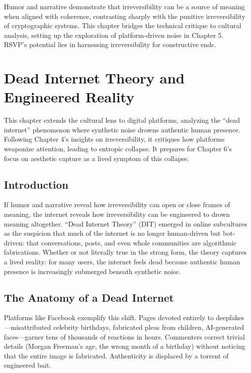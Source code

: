 \documentclass[openany]{book}
\begin{document}
Humor and narrative demonstrate that irreversibility can be a source of meaning when aligned with coherence, contrasting sharply with the punitive irreversibility of cryptographic systems. This chapter bridges the technical critique to cultural analysis, setting up the exploration of platform-driven noise in Chapter 5. RSVP’s potential lies in harnessing irreversibility for constructive ends.

\chapter{Dead Internet Theory and\\ Engineered Reality}

This chapter extends the cultural lens to digital platforms, analyzing the ``dead internet'' phenomenon where synthetic noise drowns authentic human presence. Following Chapter 4’s insights on irreversibility, it critiques how platforms weaponize attention, leading to entropic collapse. It prepares for Chapter 6’s focus on aesthetic capture as a lived symptom of this collapse.

\section{Introduction}

If humor and narrative reveal how irreversibility can open or close frames of meaning, the internet reveals how irreversibility can be engineered to drown meaning altogether. ``Dead Internet Theory'' (DIT) emerged in online subcultures as the suspicion that much of the internet is no longer human-driven but bot-driven: that conversations, posts, and even whole communities are algorithmic fabrications. Whether or not literally true in the strong form, the theory captures a lived reality: for many users, the internet feels dead because authentic human presence is increasingly submerged beneath synthetic noise.

\section{The Anatomy of a Dead Internet}

Platforms like Facebook exemplify this shift. Pages devoted entirely to deepfakes---misattributed celebrity birthdays, fabricated pleas from children, AI-generated faces---garner tens of thousands of reactions in hours. Commenters correct trivial details (Morgan Freeman’s age, the wrong month of a birthday) without noticing that the entire image is fabricated. Authenticity is displaced by a torrent of engineered bait.
\end{document}
